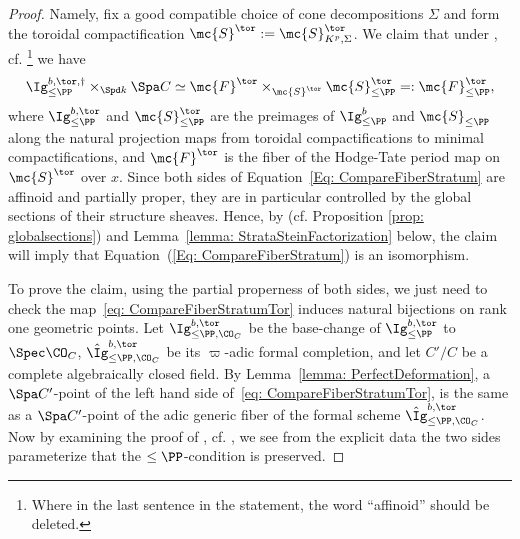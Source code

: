 \documentclass[letterpaper,11pt]{amsart}
\begin{document}
\begin{proof}
Namely, fix a good compatible choice of cone decompositions $\Sigma$ and form the toroidal compactification $\mc{S}^\tor:=\mc{S}^\tor_{K^p,\Sigma}$. We claim that under \cite[Theorem 4.4.1]{CS2}, cf. \cite[Theorem 4.3.10]{santos}\footnote{Where in the last sentence in the statement, the word ``affinoid'' should be deleted.} we have
\begin{equation}\label{eq: CompareFiberStratumTor}
    \Ig^{b,\tor,\dagger}_{\leq \PP} \times_{\Spd k}\Spa C\simeq \mc{F}^\tor\times_{\mc{S}^\tor} \mc{S}^\tor_{\leq \PP}=:\mc{F}^\tor_{\leq \PP},
\end{equation}
where $\Ig^{b,\tor}_{\leq \PP}$ and $\mc{S}^\tor_{\leq \PP}$ are the preimages of $\Ig^{b}_{\leq \PP}$ and $\mc{S}_{\leq \PP}$ along the natural projection maps from toroidal compactifications to minimal compactifications, and $\mc{F}^\tor$ is the fiber of the Hodge-Tate period map on $\mc{S}^\tor$ over $x$. Since both sides of Equation~\eqref{Eq: CompareFiberStratum} are affinoid and partially proper, they are in particular controlled by the global sections of their structure sheaves. Hence, by \cite[Lemma 4.5.2]{CS2} (cf. Proposition \ref{prop: globalsections})  and Lemma~\ref{lemma: StrataSteinFactorization} below, the claim will imply that Equation~(\ref{Eq: CompareFiberStratum}) is an isomorphism.

To prove the claim, using the partial properness of both sides, we just need to check the map~\eqref{eq: CompareFiberStratumTor} induces natural bijections on rank one geometric points. Let $\Ig^{b,\tor}_{\leq \PP, \CO_{C}}$ be the base-change of $\Ig^{b,\tor}_{\leq \PP}$ to $\Spec \CO_C$, $\hat{\Ig}^{b,\tor}_{\leq \PP, \CO_{C}}$ be its $\varpi$-adic formal completion, and let $C'/C$ be a complete algebraically closed field. By Lemma~\ref{lemma: PerfectDeformation}, a $\Spa C'$-point of the left hand side of~\eqref{eq: CompareFiberStratumTor}, is the same as a $\Spa C'$-point of the adic generic fiber of the formal scheme $\hat{\Ig}^{b,\tor}_{\leq \PP, \CO_{C}}$. Now by examining the proof of \cite[Theorem 4.4.1]{CS2}, cf. \cite[Theorem 4.3.10]{santos}, we see from the explicit data the two sides parameterize that the $\leq\PP$-condition is preserved.
\end{proof}
\end{document}
